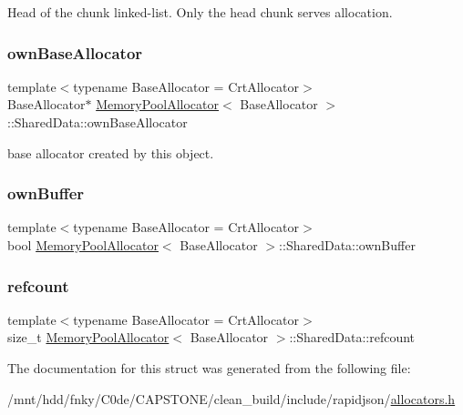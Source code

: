 Head of the chunk linked-\/list. Only the head chunk serves allocation. 

\mbox{\label{structMemoryPoolAllocator_1_1SharedData_a8e991b807bbdde89645a19bde7398bf7}} 
\subsubsection{\texorpdfstring{own\+Base\+Allocator}{ownBaseAllocator}}
{\footnotesize\ttfamily template$<$typename Base\+Allocator = Crt\+Allocator$>$ \\
Base\+Allocator$\ast$ \hyperlink{classMemoryPoolAllocator}{Memory\+Pool\+Allocator}$<$ Base\+Allocator $>$\+::Shared\+Data\+::own\+Base\+Allocator}



base allocator created by this object. 

\mbox{\label{structMemoryPoolAllocator_1_1SharedData_a89636640af96ac5eddb73c7377981eb9}} 
\subsubsection{\texorpdfstring{own\+Buffer}{ownBuffer}}
{\footnotesize\ttfamily template$<$typename Base\+Allocator = Crt\+Allocator$>$ \\
bool \hyperlink{classMemoryPoolAllocator}{Memory\+Pool\+Allocator}$<$ Base\+Allocator $>$\+::Shared\+Data\+::own\+Buffer}

\mbox{\label{structMemoryPoolAllocator_1_1SharedData_a518c933b79807f4fd3518ce6d426f2dc}} 
\subsubsection{\texorpdfstring{refcount}{refcount}}
{\footnotesize\ttfamily template$<$typename Base\+Allocator = Crt\+Allocator$>$ \\
size\+\_\+t \hyperlink{classMemoryPoolAllocator}{Memory\+Pool\+Allocator}$<$ Base\+Allocator $>$\+::Shared\+Data\+::refcount}



The documentation for this struct was generated from the following file\+:\begin{DoxyCompactItemize}
\item 
/mnt/hdd/fnky/\+C0de/\+C\+A\+P\+S\+T\+O\+N\+E/clean\+\_\+build/include/rapidjson/\hyperlink{allocators_8h}{allocators.\+h}\end{DoxyCompactItemize}
